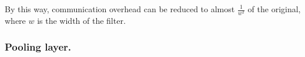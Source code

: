 \documentclass[letterpaper]{article} %
\begin{document}

    By this way, communication overhead can be reduced to almost $ \frac{1}{w^{2}} $ of the original,
    where $w$ is the width of the filter.


    \subsubsection{Pooling layer.}
\end{document}
